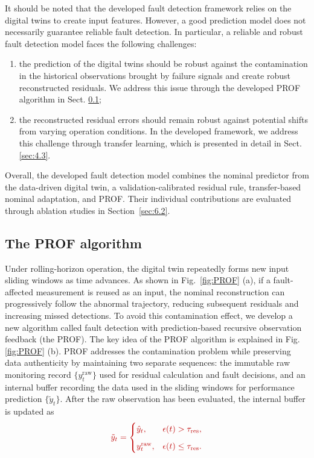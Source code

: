 \documentclass[a4paper,10pt]{cas-sc}%
\newcommand{\rev}[1]{\textcolor{revisionred}{#1}}
\begin{document}
\rev{It should be noted that the developed fault detection framework relies on the digital twins to create input features. However, a good prediction model does not necessarily guarantee reliable fault detection. In particular, a reliable and robust fault detection model faces the following challenges:}
\begin{enumerate}
	\item \rev{the prediction of the digital twins should be robust against the contamination in the historical observations brought by failure signals and create robust reconstructed residuals. We address this issue through the developed PROF algorithm in Sect. \ref{sec:4.2}};
	\item \rev{the reconstructed residual errors should remain robust against potential shifts from varying operation conditions. In the developed framework, we address this challenge through transfer learning, which is presented in detail in Sect. \ref{sec:4.3}.}
\end{enumerate}
\rev{Overall, the developed fault detection model combines the nominal predictor from the data-driven digital twin, a validation-calibrated residual rule, transfer-based nominal adaptation, and PROF. Their individual contributions are evaluated through ablation studies in Section~\ref{sec:6.2}.}

\subsection{The PROF algorithm}\label{sec:4.2}


Under rolling-horizon operation, the digital twin repeatedly forms new input sliding windows as time advances. As shown in Fig.~\ref{fig:PROF} (a), if a fault-affected measurement is reused as an input, the nominal reconstruction can progressively follow the abnormal trajectory, reducing subsequent residuals and increasing missed detections. To avoid this contamination effect, we develop a new algorithm called fault detection with prediction-based recursive observation feedback (the PROF). The key idea of the PROF algorithm is explained in Fig. \ref{fig:PROF} (b). \rev{PROF addresses the contamination problem while preserving data authenticity by maintaining two separate sequences: the immutable raw monitoring record $\{y_t^{\mathrm{raw}}\}$ used for residual calculation and fault decisions, and an internal buffer recording the data used in the sliding windows for performance prediction $\{\tilde y_t\}$. After the raw observation has been evaluated, the internal buffer is updated as}
\begin{equation}
	{\color{revisionred}\tilde y_t =
		\begin{cases}
			\hat{y}_t,          & \epsilon(t) > \tau_{\mathrm{res}},    \\[6pt]
			y_t^{\mathrm{raw}}, & \epsilon(t) \leq \tau_{\mathrm{res}}.
		\end{cases}}
	\label{eq:prof_update_rule}
\end{equation}
\end{document}
